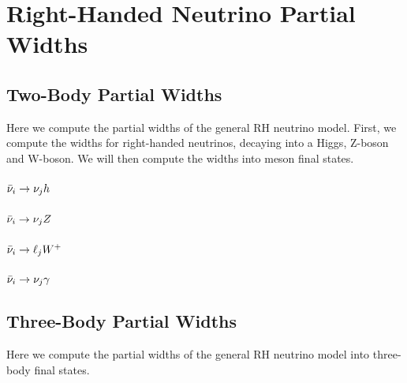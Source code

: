
\section{Right-Handed Neutrino Partial Widths}

\subsection{Two-Body Partial Widths}
Here we compute the partial widths of the general RH neutrino model. First, we
compute the widths for right-handed neutrinos, decaying into a Higgs, Z-boson and
W-boson. We will then compute the widths into meson final states.

\subsubsection{\texorpdfstring{\(\bar{\nu}_{i}\to\nu_{j}h\)}{RH-Neutrino to LH-Neutrino and Higgs}}

\subsubsection{\texorpdfstring{\(\bar{\nu}_{i}\to\nu_{j}Z\)}{RH-Neutrino to LH-Neutrino and Z-Boson}}

\subsubsection{\texorpdfstring{\(\bar{\nu}_{i}\to\ell_{j}W^{+}\)}{RH-Neutrino to Charged-Lepton and W-Boson}}

\subsubsection{\texorpdfstring{\(\bar{\nu}_{i}\to\nu_{j}\gamma\)}{RH-Neutrino to LH-Neutrino and Photon}}





\subsection{Three-Body Partial Widths}
Here we compute the partial widths of the general RH neutrino model into three-body
final states.

